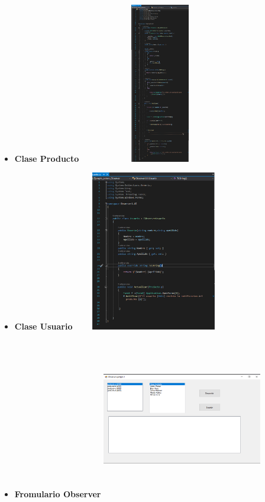 \documentclass[twoside,twocolumn]{article}
\begin{document}
\begin{itemize}
\item  \textbf{Clase Producto}
 \includegraphics[width=7cm, height=7cm]{imagenes/patron_observer_4.png}
\item  \textbf{Clase Usuario}
 \includegraphics[width=7cm, height=7cm]{imagenes/patron_observer_5.png}
\item  \textbf{Fromulario Observer}
 \includegraphics[width=7cm, height=7cm]{imagenes/patron_observer_6.png}
\\

\end{itemize}
\end{document}
